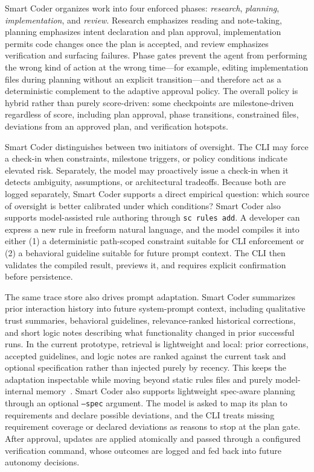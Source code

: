Smart Coder organizes work into four enforced phases: \emph{research}, \emph{planning}, \emph{implementation}, and \emph{review}. Research emphasizes reading and note-taking, planning emphasizes intent declaration and plan approval, implementation permits code changes once the plan is accepted, and review emphasizes verification and surfacing failures. Phase gates prevent the agent from performing the wrong kind of action at the wrong time---for example, editing implementation files during planning without an explicit transition---and therefore act as a deterministic complement to the adaptive approval policy. The overall policy is hybrid rather than purely score-driven: some checkpoints are milestone-driven regardless of score, including plan approval, phase transitions, constrained files, deviations from an approved plan, and verification hotspots.

Smart Coder distinguishes between two initiators of oversight. The CLI may force a check-in when constraints, milestone triggers, or policy conditions indicate elevated risk. Separately, the model may proactively issue a check-in when it detects ambiguity, assumptions, or architectural tradeoffs. Because both are logged separately, Smart Coder supports a direct empirical question: which source of oversight is better calibrated under which conditions? Smart Coder also supports model-assisted rule authoring through \texttt{sc rules add}. A developer can express a new rule in freeform natural language, and the model compiles it into either (1) a deterministic path-scoped constraint suitable for CLI enforcement or (2) a behavioral guideline suitable for future prompt context. The CLI then validates the compiled result, previews it, and requires explicit confirmation before persistence.

The same trace store also drives prompt adaptation. Smart Coder summarizes prior interaction history into future system-prompt context, including qualitative trust summaries, behavioral guidelines, relevance-ranked historical corrections, and short logic notes describing what functionality changed in prior successful runs. In the current prototype, retrieval is lightweight and local: prior corrections, accepted guidelines, and logic notes are ranked against the current task and optional specification rather than injected purely by recency. This keeps the adaptation inspectable while moving beyond static rules files and purely model-internal memory~\cite{liang2026pahf}. Smart Coder also supports lightweight spec-aware planning through an optional \texttt{--spec} argument. The model is asked to map its plan to requirements and declare possible deviations, and the CLI treats missing requirement coverage or declared deviations as reasons to stop at the plan gate. After approval, updates are applied atomically and passed through a configured verification command, whose outcomes are logged and fed back into future autonomy decisions.


